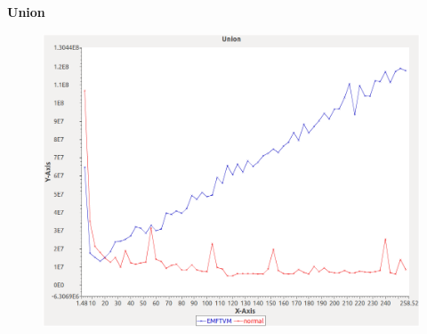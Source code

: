 \noindent\textbf{Union}

\begin{figure}[h]
\centering
\includegraphics[width=\textwidth]{graphs/sequence/Union}
\end{figure}
\pagebreak
